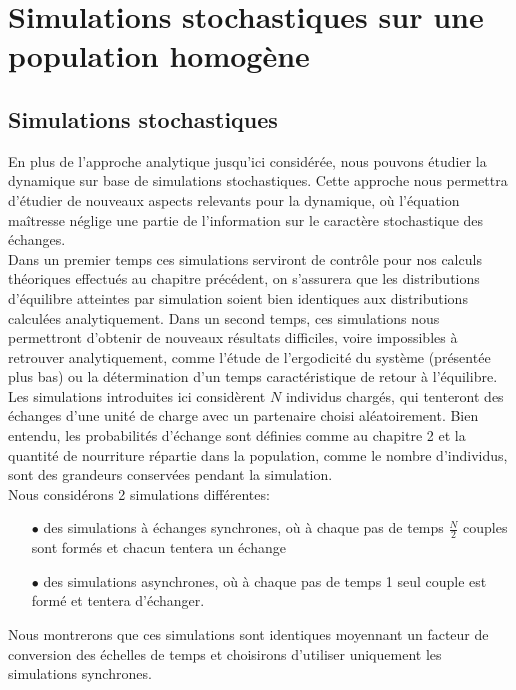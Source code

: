 \chapter{Simulations stochastiques sur une population homogène}
\section{Simulations stochastiques}
En plus de l'approche analytique jusqu'ici considérée, nous pouvons étudier la dynamique sur base de simulations stochastiques. Cette approche nous permettra d'étudier de nouveaux aspects relevants pour la dynamique, où l'équation maîtresse néglige une partie de l'information sur le caractère stochastique des échanges.\\

Dans un premier temps ces simulations serviront de contrôle pour nos calculs théoriques effectués au chapitre précédent, on s'assurera que les distributions d'équilibre atteintes par simulation soient bien identiques aux distributions calculées analytiquement. Dans un second temps, ces simulations nous permettront d'obtenir de nouveaux résultats difficiles, voire impossibles à retrouver analytiquement, comme l'étude de l'ergodicité du système (présentée plus bas) ou la détermination d'un temps caractéristique de retour à l'équilibre.\\

Les simulations introduites ici considèrent $N$ individus chargés, qui tenteront des échanges d'une unité de charge avec un partenaire choisi aléatoirement. Bien entendu, les probabilités d'échange sont définies comme au chapitre 2 et la quantité de nourriture répartie dans la population, comme le nombre d'individus, sont des grandeurs conservées pendant la simulation.\\

Nous considérons 2 simulations différentes:
\begin{itemize}
\item[$\bullet$] des simulations à échanges synchrones, où à chaque pas de temps $\frac{N}{2}$ couples sont formés et chacun tentera un échange
\item[$\bullet$] des simulations asynchrones, où à chaque pas de temps 1 seul couple est formé et tentera d'échanger.\\
\end{itemize}

Nous montrerons que ces simulations sont identiques moyennant un facteur de conversion des échelles de temps et choisirons d'utiliser uniquement les simulations synchrones.\\

